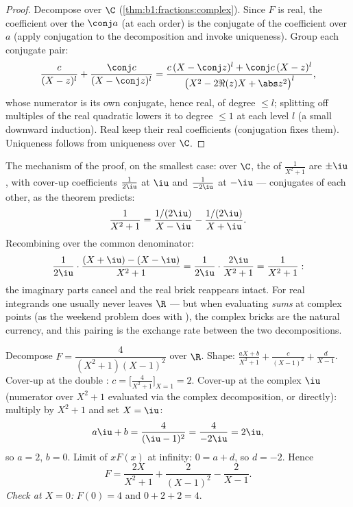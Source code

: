 \begin{proof}
Decompose over $\C$ (\cref{thm:b1:fractions:complex}). Since $F$ is
real, the coefficient over the  $\conj a$ (at each order) is the
conjugate of the coefficient over $a$ (apply conjugation to the
decomposition and invoke uniqueness). Group each conjugate pair:
\[
\frac{c}{(X - z)^l} + \frac{\conj c}{(X - \conj z)^l}
= \frac{c\,(X - \conj z)^l + \conj c\,(X - z)^l}{\bigl(X^2 - 2\Re(z)X
+ \abs z^2\bigr)^{l}},
\]
whose numerator is its own conjugate, hence real, of degree $\leq l$;
splitting off multiples of the real quadratic lowers it to degree
$\leq 1$ at each level $l$ (a small downward induction). Real 
keep their real coefficients (conjugation fixes them). Uniqueness
follows from uniqueness over $\C$.
\end{proof}

\begin{example}\label{ex:b1:fractions:pairing}
The mechanism of the proof, on the smallest case: over $\C$, the
 of $\frac1{X^2+1}$ are $\pm\iu$, with cover-up coefficients
$\frac1{2\iu}$ at $\iu$ and $\frac1{-2\iu}$ at $-\iu$ ---
conjugates of each other, as the theorem predicts:
\[
\frac{1}{X^2 + 1}
= \frac{1/(2\iu)}{X - \iu} - \frac{1/(2\iu)}{X + \iu} .
\]
Recombining over the common denominator:
\[
\frac{1}{2\iu}\cdot\frac{(X + \iu) - (X - \iu)}{X^2 + 1}
= \frac{1}{2\iu}\cdot\frac{2\iu}{X^2 + 1} = \frac{1}{X^2+1} :
\]
the imaginary parts cancel and the real brick reappears intact.
For real integrands one usually never leaves $\R$ --- but when
evaluating \emph{sums} at complex points (as the weekend problem
does with ), the complex bricks are the natural
currency, and this pairing is the exchange rate between the two
decompositions.
\end{example}

\begin{example}\label{ex:b1:fractions:real}
Decompose $F = \dfrac{4}{(X^2+1)(X-1)^2}$ over $\R$. Shape:
$\frac{aX + b}{X^2 + 1} + \frac{c}{(X-1)^2} + \frac{d}{X - 1}$.
Cover-up at the double : $c = \bigl[\frac{4}{X^2+1}\bigr]_{X=1} =
2$. Cover-up at the complex  $\iu$ (numerator over $X^2 + 1$
evaluated via the complex decomposition, or directly): multiply by
$X^2 + 1$ and set $X = \iu$:
\[
a\iu + b = \frac{4}{(\iu - 1)^2} = \frac{4}{-2\iu} = 2\iu ,
\]
so $a = 2$, $b = 0$. Limit of $xF(x)$ at infinity: $0 = a + d$, so $d
= -2$. Hence
\[
F = \frac{2X}{X^2+1} + \frac{2}{(X-1)^2} - \frac{2}{X-1} .
\]
\emph{Check at $X = 0$:} $F(0) = 4$ and $0 + 2 + 2 = 4$.
\end{example}

